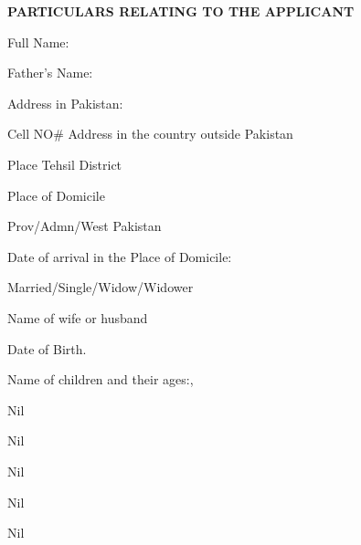 \documentclass{article}
\begin{document}
\vspace{0.5cm}

\hrulefill
\begin{center}
\textbf{PARTICULARS RELATING TO THE APPLICANT}
\end{center}
\hrulefill

\vspace{0.5cm}

Full Name: \underline{\hspace{8cm}}

Father's Name: \underline{\hspace{8cm}}

Address in Pakistan: \underline{\hspace{8cm}}

Cell NO\# \underline{\hspace{3cm}} Address in the country outside Pakistan \underline{\hspace{8cm}}

Place \underline{\hspace{3cm}} Tehsil \underline{\hspace{3cm}} District \underline{\hspace{3cm}}

Place of Domicile \underline{\hspace{8cm}}

Prov/Admn/West Pakistan \underline{\hspace{8cm}}

Date of arrival in the Place of Domicile: \underline{\hspace{8cm}}

Married/Single/Widow/Widower \underline{\hspace{8cm}}

Name of wife or husband \underline{\hspace{8cm}}

Date of Birth. \underline{\hspace{8cm}}

Name of children and their ages:,

\underline{\hspace{8cm}} Nil

\underline{\hspace{8cm}} Nil

\underline{\hspace{8cm}} Nil

\underline{\hspace{8cm}} Nil

\underline{\hspace{8cm}} Nil
\end{document}
